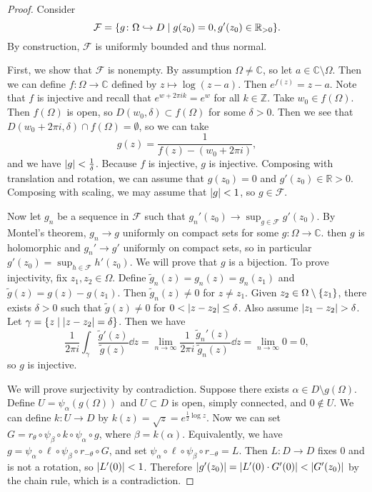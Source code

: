 \documentclass[leqno, openany]{memoir}
\theoremstyle{definition}
\theoremstyle{remark}
\theoremstyle{plain}
\theoremstyle{definition}
\theoremstyle{remark}
\newcommand{\R}{\mathbb{R}}
\newcommand{\C}{\mathbb{C}}
\newcommand{\Z}{\mathbb{Z}}
\newcommand{\mc}[1]{\mathcal{#1}}
\newcommand{\wt}[1]{\widetilde{#1}}
\begin{document}
\begin{proof} Consider \[ \mc{F} = \qty{g \colon \Omega \hookrightarrow D \mid
g(z_0) = 0, g'(z_0) \in \R_{>0}}. \] By construction, $\mc{F}$ is uniformly
bounded and thus normal.

    First, we show that $\mc{F}$ is nonempty. By assumption $\Omega \neq \C$,
    so let $a \in \C \setminus \Omega$. Then we can define $f \colon \Omega \to
    \C$ defined by $z \mapsto \log(z-a)$. Then $e^{f(z)} = z-a$. Note that $f$
    is injective and recall that $e^{w + 2\pi i k} = e^w$ for all $k \in \Z$.
    Take $w_0 \in f(\Omega)$. Then $f(\Omega)$ is open, so $D(w_0, \delta)
    \subset f(\Omega)$ for some $\delta > 0$. Then we see that $D(w_0 + 2 \pi
    i, \delta) \cap f(\Omega) = \emptyset$, so we can take \[ g(z) =
    \frac{1}{f(z) - (w_0 + 2 \pi i)}, \] and we have $\abs{g} <
    \frac{1}{\delta}$. Because $f$ is injective, $g$ is injective. Composing
    with translation and rotation, we can assume that $g(z_0) = 0$ and $g'(z_0)
    \in \R > 0$. Composing with scaling, we may assume that $\abs{g} < 1$, so
    $g \in \mc{F}$.

    Now let $g_n$ be a sequence in $\mc{F}$ such that $g_n'(z_0) \to \sup_{g
    \in \mc{F}} g'(z_0)$. By Montel's theorem, $g_n \to g$ uniformly on compact
    sets for some $g \colon \Omega \to \C$. then $g$ is holomorphic and $g_n'
    \to g'$ uniformly on compact sets, so in particular $g'(z_0) = \sup_{h \in
    \mc{F}} h'(z_0)$. We will prove that $g$ is a bijection. To prove
    injectivity, fix $z_1, z_2 \in \Omega$. Define $\wt{g}_n(z) = g_n(z) =
    g_n(z_1)$ and $\wt{g}(z) = g(z) - g(z_1)$. Then $\wt{g}_n(z) \neq 0$ for $z
    \neq z_1$. Given $z_2 \in \Omega \setminus \qty{z_1}$, there exists $\delta
    > 0$ such that $\wt{g}(z) \neq 0$ for $0 < \abs{z - z_2} \leq \delta$. Also
    assume $\abs{z_1 - z_2} > \delta$. Let $\gamma = \qty{z \mid \abs{z-z_2} =
    \delta}$. Then we have \[ \frac{1}{2 \pi i} \int_{\gamma}
    \frac{\wt{g}'(z)}{\wt{g}(z)} \dd{z} = \lim_{n \to \infty} \frac{1}{2 \pi i}
\frac{\wt{g}_n'(z)}{\wt{g}_n(z)} \dd{z} = \lim_{n \to \infty} 0 = 0, \] so $g$
is injective.

    We will prove surjectivity by contradiction. Suppose there exists $\alpha
\in D \setminus g(\Omega)$. Define $U = \psi_{\alpha}(g(\Omega))$ and $U
\subset D$ is open, simply connected, and $0 \notin U$. We can define $k \colon
U \to D$ by $k(z) = \sqrt{z} = e^{\frac{1}{2} \log z}$. Now we can set $G =
r_{\theta} \circ \psi_{\beta} \circ k \circ \psi_{\alpha} \circ g$, where
$\beta = k(\alpha)$. Equivalently, we have $g = \psi_{\alpha} \circ\ell \circ
\psi_{\beta} \circ r_{-\theta} \circ G$, and set $\psi_{\alpha} \circ \ell
\circ \psi_{\beta} \circ r_{-\theta} = L$. Then $L \colon D \to D$ fixes $0$
and is not a rotation, so $\abs{L'(0)} < 1$. Therefore $\abs{g'(z_0)} =
\abs{L'(0) \cdot G'(0)} < \abs{G'(z_0)}$ by the chain rule, which is a
contradiction.  \end{proof}
\end{document}

